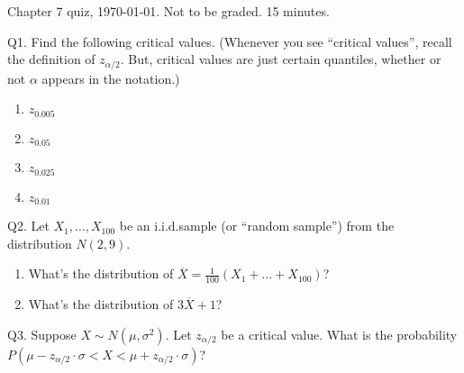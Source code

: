 \documentclass[12pt]{article}
\begin{document}
\thispagestyle{empty}

Chapter 7 quiz, \today. Not to be graded. 15 minutes.
\bigskip

Q1.
Find the following critical values.
(Whenever you see ``critical values'', recall the definition
of $z_{\alpha/2}$. But, critical values are just certain quantiles,
whether or not $\alpha$ appears in the notation.)
\begin{enumerate}
\item $z_{0.005}$
\item $z_{0.05}$
\item $z_{0.025}$
\item $z_{0.01}$
\end{enumerate}
\vskip2cm

Q2.
Let $X_1,\dotsc,X_{100}$ be an i.i.d.\@ sample (or ``random sample'')
from the distribution $N(2, 9)$.
\begin{enumerate}
\item What's the distribution of
    $\overline{X} = \frac{1}{100}(X_1+\dotsc+X_{100})$?
\item What's the distribution of $3\overline{X} + 1$?
\end{enumerate}

\vskip5cm

Q3.
Suppose $X\sim N(\mu, \sigma^2)$.
Let $z_{\alpha/2}$ be a critical value.
What is the probability\\
$P(\mu - z_{\alpha/2}\cdot \sigma < X < \mu + z_{\alpha/2}\cdot \sigma)$?
\end{document}
